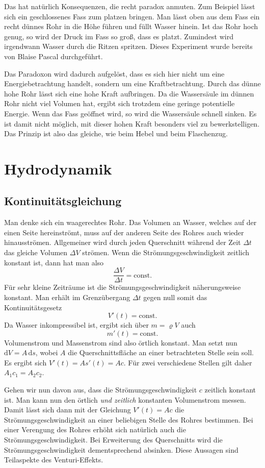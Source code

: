 \documentclass[a4paper,10pt,fleqn,twocolumn,twoside]{scrartcl}
\begin{document}
Das hat natürlich Konsequenzen, die recht paradox anmuten.
Zum Beispiel lässt sich ein geschlossenes Fass zum platzen bringen.
Man lässt oben aus dem Fass ein recht dünnes Rohr in die Höhe führen
und füllt Wasser hinein. Ist das Rohr hoch genug, so wird der Druck
im Fass so groß, dass es platzt. Zumindest wird irgendwann Wasser
durch die Ritzen spritzen. Dieses Experiment wurde bereits von
Blaise Pascal durchgeführt.

Das Paradoxon wird dadurch aufgelöst, dass es sich hier nicht um
eine Energiebetrachtung handelt, sondern um eine Kraftbetrachtung.
Durch das dünne hohe Rohr lässt sich eine hohe Kraft aufbringen.
Da die Wassersäule im dünnen Rohr nicht viel Volumen hat, ergibt sich
trotzdem eine geringe potentielle Energie. Wenn das Fass geöffnet
wird, so wird die Wassersäule schnell sinken. Es ist damit nicht
möglich, mit dieser hohen Kraft besonders viel zu bewerkstelligen.
Das Prinzip ist also das gleiche, wie beim Hebel und beim Flaschenzug.

\section{Hydrodynamik}
\subsection{Kontinuitätsgleichung}
Man denke sich ein waagerechtes Rohr. Das Volumen an Wasser, welches
auf der einen Seite hereinströmt, muss auf der anderen Seite des
Rohres auch wieder hinausströmen. Allgemeiner wird durch jeden
Querschnitt während der Zeit \(\Delta t\) das gleiche Volumen
\(\Delta V\) strömen. Wenn die Strömungsgeschwindigkeit zeitlich
konstant ist, dann hat man also
\[\frac{\Delta V}{\Delta t} = \mathrm{const.}\]
Für sehr kleine Zeiträume ist die Strömungsgeschwindigkeit
näherungsweise konstant. Man erhält im Grenzübergang \(\Delta t\)
gegen null somit das Kontinuitätsgesetz
\[V'(t) = \mathrm{const.}\]
Da Wasser inkompressibel ist, ergibt sich über \(m=\varrho V\) auch
\[m'(t) = \mathrm{const.}\]
Volumenstrom und Massenstrom sind also örtlich konstant.
Man setzt nun \(\mathrm dV=A\,\mathrm ds\), wobei \(A\) die
Querschnittsfläche an einer betrachteten Stelle sein soll.
Es ergibt sich \(V'(t) = As'(t) = Ac\). Für zwei verschiedene
Stellen gilt daher \(A_1c_1 = A_2c_2\).

Gehen wir nun davon aus, dass die Strömungsgeschwindigkeit \(c\)
zeitlich konstant ist. Man kann nun den örtlich \textit{und zeitlich}
konstanten Volumenstrom messen. Damit lässt sich dann mit der
Gleichung \(V'(t) = Ac\) die Strömungsgeschwindigkeit an einer
beliebigen Stelle des Rohres bestimmen. Bei einer Verengung des
Rohres erhöht sich natürlich auch die Strömungsgeschwindigkeit.
Bei Erweiterung des Querschnitts wird die Strömungsgeschwindigkeit
dementsprechend absinken. Diese Aussagen sind Teilaspekte des
Venturi-Effekts.
\end{document}

